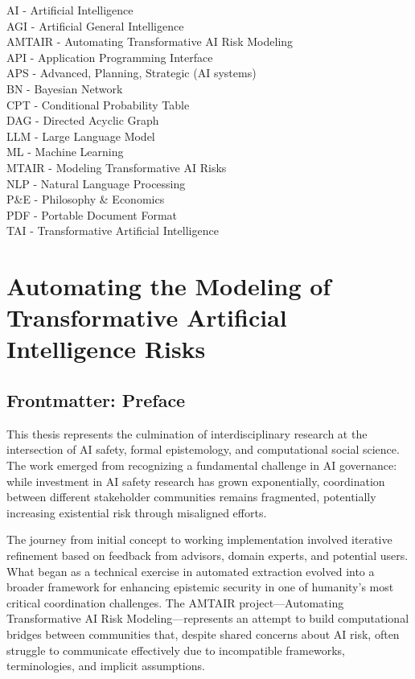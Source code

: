 \documentclass[
  11pt,
  letterpaper,
  openany]{book}
\begin{document}
AI - Artificial Intelligence\\
AGI - Artificial General Intelligence\\
AMTAIR - Automating Transformative AI Risk Modeling\\
API - Application Programming Interface\\
APS - Advanced, Planning, Strategic (AI systems)\\
BN - Bayesian Network\\
CPT - Conditional Probability Table\\
DAG - Directed Acyclic Graph\\
LLM - Large Language Model\\
ML - Machine Learning\\
MTAIR - Modeling Transformative AI Risks\\
NLP - Natural Language Processing\\
P\&E - Philosophy \& Economics\\
PDF - Portable Document Format\\
TAI - Transformative Artificial Intelligence


\chapter{Automating the Modeling of Transformative Artificial
Intelligence
Risks}\label{automating-the-modeling-of-transformative-artificial-intelligence-risks}

\section{Frontmatter: Preface}\label{frontmatter-preface}

This thesis represents the culmination of interdisciplinary research at
the intersection of AI safety, formal epistemology, and computational
social science. The work emerged from recognizing a fundamental
challenge in AI governance: while investment in AI safety research has
grown exponentially, coordination between different stakeholder
communities remains fragmented, potentially increasing existential risk
through misaligned efforts.

The journey from initial concept to working implementation involved
iterative refinement based on feedback from advisors, domain experts,
and potential users. What began as a technical exercise in automated
extraction evolved into a broader framework for enhancing epistemic
security in one of humanity's most critical coordination challenges. The
AMTAIR project---Automating Transformative AI Risk Modeling---represents
an attempt to build computational bridges between communities that,
despite shared concerns about AI risk, often struggle to communicate
effectively due to incompatible frameworks, terminologies, and implicit
assumptions.
\end{document}
